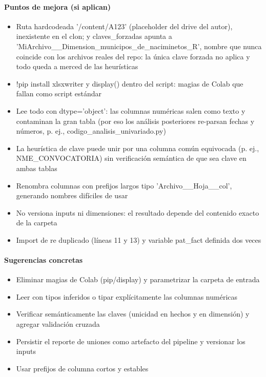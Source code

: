 \paragraph{Puntos de mejora (si aplican)}
\begin{itemize}
  \item Ruta hardcodeada '/content/A123' (placeholder del drive del autor), inexistente en el clon; y claves\_forzadas apunta a 'MiArchivo\_\_Dimension\_municipos\_de\_naciminetos\_R', nombre que nunca coincide con los archivos reales del repo: la única clave forzada no aplica y todo queda a merced de las heurísticas
  \item !pip install xlsxwriter y display() dentro del script: magias de Colab que fallan como script estándar
  \item Lee todo con dtype='object': las columnas numéricas salen como texto y contaminan la gran tabla (por eso los análisis posteriores re-parsan fechas y números, p. ej., codigo\_analisis\_univariado.py)
  \item La heurística de clave puede unir por una columna común equivocada (p. ej., NME\_CONVOCATORIA) sin verificación semántica de que sea clave en ambas tablas
  \item Renombra columnas con prefijos largos tipo 'Archivo\_\_Hoja\_\_col', generando nombres difíciles de usar
  \item No versiona inputs ni dimensiones: el resultado depende del contenido exacto de la carpeta
  \item Import de re duplicado (líneas 11 y 13) y variable pat\_fact definida dos veces
\end{itemize}

\paragraph{Sugerencias concretas}
\begin{itemize}
  \item Eliminar magias de Colab (pip/display) y parametrizar la carpeta de entrada
  \item Leer con tipos inferidos o tipar explícitamente las columnas numéricas
  \item Verificar semánticamente las claves (unicidad en hechos y en dimensión) y agregar validación cruzada
  \item Persistir el reporte de uniones como artefacto del pipeline y versionar los inputs
  \item Usar prefijos de columna cortos y estables
\end{itemize}

